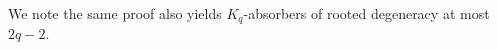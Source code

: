 \documentclass[11pt]{article}
\numberwithin{equation}{section}
\newcounter{i}
\theoremstyle{plain}
\theoremstyle{plain} %
\theoremstyle{definition}
\begin{document}
We note the same proof also yields $K_q$-absorbers of rooted degeneracy at most $2q-2$.





\end{document}
